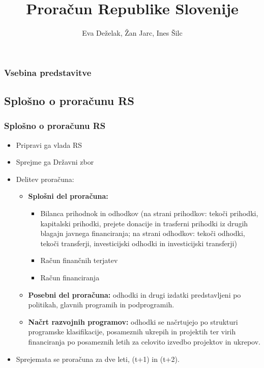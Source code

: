 \documentclass[10pt]{beamer}
\begin{document}
\title[Proračun Republike Slovenije]{Proračun Republike Slovenije}
\author{Eva Deželak, Žan Jarc, Ines Šilc}


\begin{frame}
	\titlepage
\end {frame}

\begin{frame}
	\frametitle{Vsebina predstavitve}
	\tableofcontents
\end {frame}

\begin{frame}
\section[Splošno o proračunu RS]{Splošno o proračunu RS}
\frametitle{Splošno o proračunu RS}
\begin{itemize}
\item Pripravi ga vlada RS
\item Sprejme ga Državni zbor
\item Delitev proračuna:
	\begin{itemize}
	\item \textbf{Splošni del proračuna:}
		\begin{itemize}
		\item Bilanca prihodnok in odhodkov (na strani prihodkov: tekoči prihodki, kapitalski prihodki, prejete donacije in trasferni prihodki iz drugih blagajn javnega financiranja; na strani odhodkov: tekoči odhodki, tekoči transferji, investicijski odhodki in investicijski transferji)
		\item Račun finančnih terjatev
		\item Račun financiranja
		\end{itemize}
	\item \textbf{Posebni del proračuna:} odhodki in drugi izdatki predstavljeni po politikah, glavnih programih in podprogramih.
	\item \textbf{Načrt razvojnih programov:} odhodki se načrtujejo po strukturi programske klasifikacije, posameznih ukrepih in projektih ter virih financiranja po  posameznih letih za celovito izvedbo projektov in ukrepov.
	\end{itemize}
\item Sprejemata se proračuna za dve leti, (t+1) in (t+2).
\end{itemize}
\end{frame}
\end{document}
